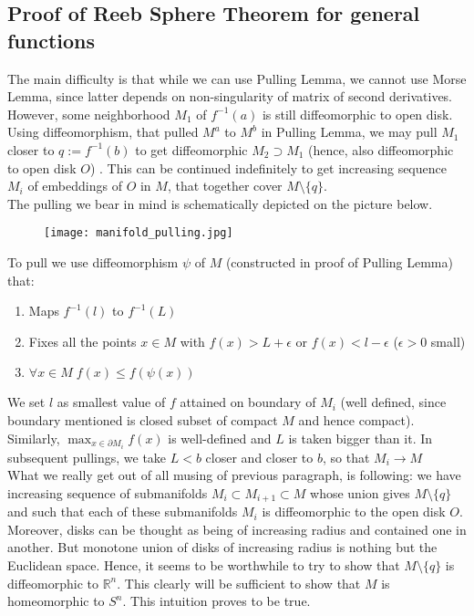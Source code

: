 \documentclass[8pt]{article} %
\begin{document}
\subsection{Proof of Reeb Sphere Theorem for general functions}
The main difficulty is that while we can use Pulling Lemma, we cannot use Morse Lemma, since latter depends on non-singularity of matrix of second
derivatives. However, some neighborhood $M_1$ of $f^{-1}(a)$ is still diffeomorphic to open disk. Using diffeomorphism, that pulled $M^a$ to $M^b$
in Pulling Lemma, we may pull $M_1$ closer to $q:=f^{-1}(b)$ to get diffeomorphic $M_2\supset M_1$ (hence, also diffeomorphic to open disk $O$)
. This can be continued indefinitely
to get increasing sequence $M_i$ of embeddings of $O$ in $M$, that together cover $M\setminus\{q\}$.\\
The pulling we bear in mind is schematically depicted on the picture below.
\begin{figure}[H]
\centering
\texttt{[image: manifold\_pulling.jpg]}
\caption{\label{manifoldPulling}}
\end{figure}
To pull we use diffeomorphism $\psi$ of $M$ (constructed in proof of Pulling Lemma) that:
\begin{enumerate}
	\item{Maps $f^{-1}(l)$ to $f^{-1}(L)$}
	\item{Fixes all the points $x\in M$ with $f(x)>L+\epsilon$ or $f(x)<l-\epsilon$ ($\epsilon>0$ small)}
	\item{$\forall x\in M\;f(x)\leq f(\psi(x))$}
\end{enumerate}
We set $l$ as smallest value of $f$ attained on boundary of $M_i$ (well defined, since boundary mentioned is closed subset of compact $M$ and
hence compact). Similarly, $\max_{x\in \partial M_i}f(x)$ is well-defined and $L$ is taken bigger than it.
In subsequent pullings, we take $L<b$ closer and closer to $b$, so that $M_i\to M$\\
What we really get out of all musing of previous paragraph, is following: we have increasing sequence of submanifolds $M_i\subset M_{i+1}\subset M$
whose union gives $M\setminus\{q\}$ and such that each of these submanifolds $M_i$ is diffeomorphic to the open disk $O$.
Moreover, disks can be thought as being of increasing radius and contained one in 
another. But monotone union of disks of increasing radius is nothing but the
Euclidean space. Hence, it seems to be worthwhile to try to show that $M\setminus\{q\}$ is diffeomorphic to $\mathbb{R}^n$.
This clearly will be sufficient to show that $M$ is homeomorphic to $S^n$. This intuition proves to be true.\\
\end{document}
